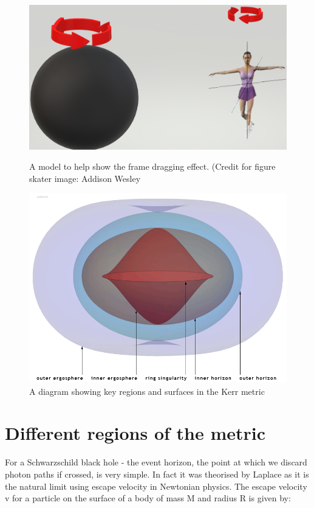 \documentclass[oneside,openright,frontopenright, singlespacing]{dmathesis}
\begin{document}
\vspace{1em}
	\begin{figure}[!ht]
	\centering
	\begin{minipage}{0.5\textwidth}
		\centering
		\includegraphics[width=0.8\linewidth]{img/addison-wesley}
		\caption{A model to help show the frame dragging effect. (Credit for figure skater image: Addison Wesley}
	\end{minipage}%
	\hfill
	\begin{minipage}{0.5\textwidth}
		\centering
		\includegraphics[width=0.8\linewidth]{img/Kerr-surfaces}
		\caption{A diagram showing key regions and surfaces in the Kerr metric \cite{yukterezkerrnewman}}
	\end{minipage}
\end{figure}

\section{Different regions of the metric}

	For a Schwarzschild black hole - the event horizon, the point at which we discard photon paths if crossed, is very simple. In fact it was theorised by Laplace as it is the natural limit using escape velocity in Newtonian physics. The escape velocity v for a particle on the surface of a body of mass M and radius R is given by:
\end{document}

